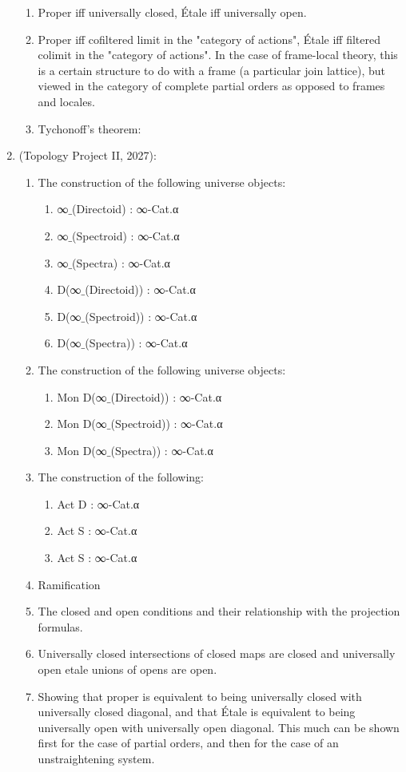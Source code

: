 \documentclass{book}
\begin{document}
\begin{enumerate}
\begin{enumerate}
\item Proper iff universally closed, Étale iff universally open.
\item Proper iff cofiltered limit in the "category of actions", Étale iff filtered colimit in the "category of actions". In the case of frame-local theory, this is a certain structure to do with a frame (a particular join lattice), but viewed in the category of complete partial orders as opposed to frames and locales.
\item Tychonoff's theorem: 
\end{enumerate}
\item (Topology Project II, 2027):
\begin{enumerate}
\item The construction of the following universe objects:
\begin{enumerate}
\item ∞${}\_$(Directoid) : ∞-Cat.α
\item ∞${}\_$(Spectroid) : ∞-Cat.α
\item ∞${}\_$(Spectra) : ∞-Cat.α
\item D(∞${}\_$(Directoid)) : ∞-Cat.α
\item D(∞${}\_$(Spectroid)) : ∞-Cat.α
\item D(∞${}\_$(Spectra)) : ∞-Cat.α
\end{enumerate}
\item The construction of the following universe objects:
\begin{enumerate}
\item Mon D(∞${}\_$(Directoid)) : ∞-Cat.α
\item Mon D(∞${}\_$(Spectroid)) : ∞-Cat.α
\item Mon D(∞${}\_$(Spectra)) : ∞-Cat.α
\end{enumerate}
\item The construction of the following:
\begin{enumerate}
\item Act D : ∞-Cat.α 
\item Act S : ∞-Cat.α
\item Act S : ∞-Cat.α
\end{enumerate}
\item Ramification 
\item The closed and open conditions and their relationship with the projection formulas.
\item Universally closed intersections of closed maps are closed and universally open etale unions of opens are open.
\item Showing that proper is equivalent to being universally closed with universally closed diagonal, and that Étale is equivalent to being universally open with universally open diagonal. This much can be shown first for the case of partial orders, and then for the case of an unstraightening system.

\end{enumerate}
\end{enumerate}
\end{document}
